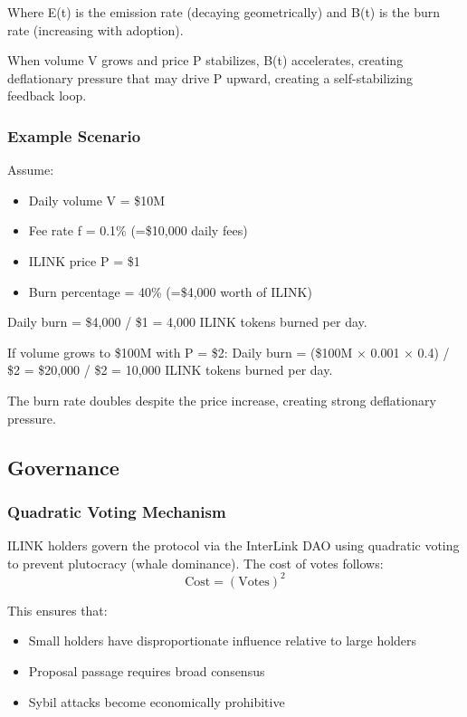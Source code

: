 \documentclass[11pt,a4paper]{article}
\begin{document}
Where E(t) is the emission rate (decaying geometrically) and B(t) is the burn rate (increasing with adoption).

When volume V grows and price P stabilizes, B(t) accelerates, creating deflationary pressure that may drive P upward, creating a self-stabilizing feedback loop.

\subsubsection{Example Scenario}
Assume:
\begin{itemize}
    \item Daily volume V = \$10M
    \item Fee rate f = 0.1\% (=\$10,000 daily fees)
    \item ILINK price P = \$1
    \item Burn percentage = 40\% (=\$4,000 worth of ILINK)
\end{itemize}

Daily burn = \$4,000 / \$1 = 4,000 ILINK tokens burned per day.

If volume grows to \$100M with P = \$2:
Daily burn = (\$100M × 0.001 × 0.4) / \$2 = \$20,000 / \$2 = 10,000 ILINK tokens burned per day.

The burn rate doubles despite the price increase, creating strong deflationary pressure.

\subsection{Governance}

\subsubsection{Quadratic Voting Mechanism}
ILINK holders govern the protocol via the InterLink DAO using quadratic voting to prevent plutocracy (whale dominance). The cost of votes follows:
$$ \text{Cost} = (\text{Votes})^2 $$

This ensures that:
\begin{itemize}
    \item Small holders have disproportionate influence relative to large holders
    \item Proposal passage requires broad consensus
    \item Sybil attacks become economically prohibitive
\end{itemize}
\end{document}
